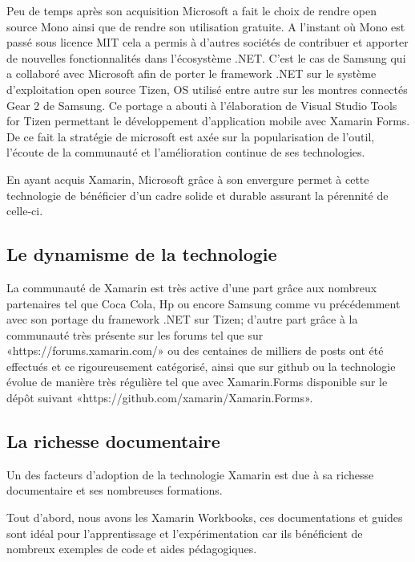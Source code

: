\documentclass[11]{article}
\begin{document}
\vspace{0.5cm}
   
Peu de temps après son acquisition Microsoft a fait le choix de rendre open source Mono ainsi que de rendre son utilisation gratuite.
A l’instant où Mono est passé sous licence MIT cela a permis à d’autres sociétés de contribuer et apporter de nouvelles fonctionnalités dans l’écosystème .NET. C’est le cas de Samsung qui a collaboré avec Microsoft afin de porter le framework .NET sur le système d’exploitation open source Tizen, OS utilisé entre autre sur les montres connectés Gear 2 de Samsung. Ce portage a abouti à l’élaboration de Visual Studio Tools for Tizen permettant le développement d’application mobile avec Xamarin Forms. De ce fait la stratégie de microsoft est axée sur la popularisation de l’outil, l’écoute de la communauté et l’amélioration continue de ses technologies.   
      
\vspace{0.5cm}
 
 En ayant acquis Xamarin, Microsoft grâce à son envergure permet à cette technologie de bénéficier d’un cadre solide et durable assurant la pérennité de celle-ci. 


 \subsection{Le dynamisme de la technologie}
 
 La communauté de Xamarin est très active d’une part grâce aux nombreux partenaires tel que Coca Cola, Hp ou encore Samsung comme vu précédemment avec son portage du framework .NET sur Tizen; d’autre part grâce à la communauté très présente sur les forums tel que sur «https://forums.xamarin.com/»  ou des centaines de milliers de posts ont été effectués et ce rigoureusement catégorisé, ainsi que sur github ou la technologie évolue de manière très régulière tel que avec Xamarin.Forms disponible sur le dépôt suivant «https://github.com/xamarin/Xamarin.Forms».


 \subsection{La richesse documentaire}
 Un des facteurs d'adoption de la technologie Xamarin est due à sa richesse documentaire et ses nombreuses formations.
  
\vspace{0.5cm}
   
Tout d’abord, nous avons les Xamarin Workbooks, ces documentations et guides sont idéal pour l’apprentissage et l’expérimentation car ils bénéficient de nombreux exemples de code et aides pédagogiques.
  
\end{document}
